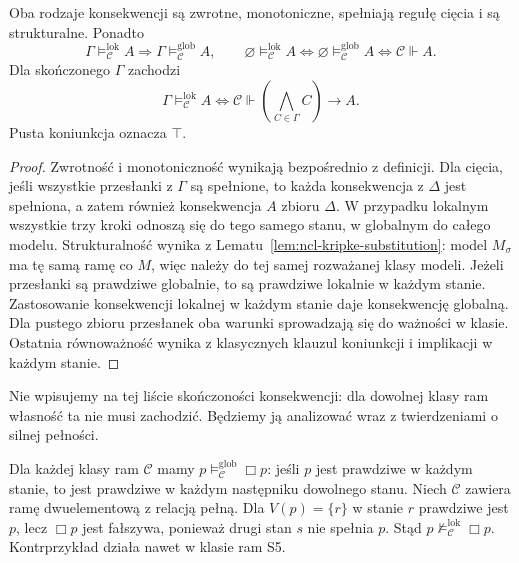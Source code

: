 \begin{stwierdzenie}
\label{prop:ncl-kripke-consequence-laws}
Oba rodzaje konsekwencji są zwrotne,
monotoniczne, spełniają regułę cięcia
i są strukturalne. Ponadto
\[
 \Gamma\models_{\mathcal C}^{\mathrm{lok}}A
 \Longrightarrow
 \Gamma\models_{\mathcal C}^{\mathrm{glob}}A,
 \qquad
 \varnothing\models_{\mathcal C}^{\mathrm{lok}}A
 \iff \varnothing\models_{\mathcal C}^{\mathrm{glob}}A
 \iff\mathcal C\Vdash A.
\]
Dla skończonego $\Gamma$ zachodzi
\[
 \Gamma\models_{\mathcal C}^{\mathrm{lok}}A
 \iff\mathcal C\Vdash
        \left(\bigwedge_{C\in\Gamma}C\right)\to A.
\]
Pusta koniunkcja oznacza $\top$.
\end{stwierdzenie}
\begin{proof}
Zwrotność i monotoniczność wynikają
bezpośrednio z definicji. Dla cięcia,
jeśli wszystkie przesłanki z $\Gamma$ są
spełnione, to każda konsekwencja z $\Delta$
jest spełniona, a zatem również konsekwencja
$A$ zbioru $\Delta$. W przypadku lokalnym
wszystkie trzy kroki odnoszą się do tego
samego stanu, w globalnym do całego modelu.
Strukturalność wynika z
Lematu~\ref{lem:ncl-kripke-substitution}:
model $M_\sigma$ ma tę samą ramę co $M$,
więc należy do tej samej rozważanej klasy modeli.
Jeżeli przesłanki są prawdziwe globalnie,
to są prawdziwe lokalnie w każdym stanie.
Zastosowanie konsekwencji lokalnej w każdym
stanie daje konsekwencję globalną.
Dla pustego zbioru przesłanek oba warunki
sprowadzają się do ważności w klasie.
Ostatnia równoważność wynika z klasycznych
klauzul koniunkcji i implikacji w każdym stanie.
\end{proof}
Nie wpisujemy na tej liście skończoności
konsekwencji: dla dowolnej klasy ram własność
ta nie musi zachodzić. Będziemy ją analizować
wraz z twierdzeniami o silnej pełności.

\begin{przyklad}
\label{ex:ncl-kripke-global-not-local}
Dla każdej klasy ram $\mathcal C$ mamy
$p\models_{\mathcal C}^{\mathrm{glob}}\Box p$:
jeśli $p$ jest prawdziwe w każdym stanie,
to jest prawdziwe w każdym następniku
dowolnego stanu.
Niech $\mathcal C$ zawiera ramę
dwuelementową z relacją pełną.
Dla $V(p)=\{r\}$ w stanie $r$ prawdziwe jest
$p$, lecz $\Box p$ jest fałszywa,
ponieważ drugi stan $s$ nie spełnia $p$.
Stąd $p\not\models_{\mathcal C}^{\mathrm{lok}}\Box p$.
Kontrprzykład działa nawet w klasie ram S5.
\end{przyklad}

